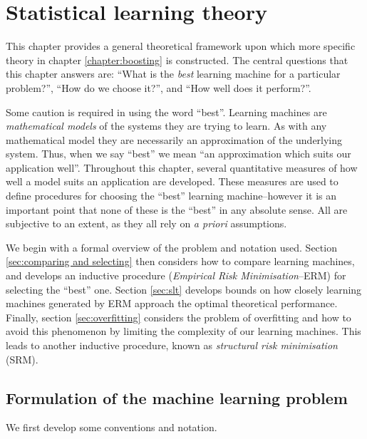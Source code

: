 
\chapter{Statistical learning theory}
\label{chapter:slt}

This chapter provides a general theoretical framework upon which more
specific theory in chapter \ref{chapter:boosting} is constructed.  The
central questions that this chapter answers are: ``What is the
\emph{best} learning machine for a particular problem?'', ``How do we
choose it?'', and ``How well does it perform?''.

Some caution is required in using the word ``best''.  Learning
machines are \emph{mathematical models} of the systems they are trying
to learn.  As with any mathematical model they are necessarily an
approximation of the underlying system.  Thus, when we say
``best'' we mean ``an approximation which suits our application
well''.  Throughout this chapter, several quantitative
measures of how well a model suits an application are developed.
These measures are used to define procedures for choosing the ``best''
learning machine--however it is an important point that none of
these is the ``best'' in any absolute sense.  All are subjective to an
extent, as they all rely on \emph{a priori} assumptions.

We begin with a formal overview of the problem and notation used.
Section \ref{sec:comparing and selecting} then considers how to
compare learning machines, and develops an inductive procedure
(\emph{Empirical Risk Minimisation}--ERM) for selecting the ``best'' one.
Section \ref{sec:slt} develops bounds on how closely learning machines
generated by ERM approach the optimal theoretical performance.
Finally, section \ref{sec:overfitting} considers the problem of
overfitting and how to avoid this phenomenon by limiting the
complexity of our learning machines.  This leads to another inductive
procedure, known as \emph{structural risk minimisation} (SRM).


\section{Formulation of the machine learning problem}
\label{sec:formulation}

We first develop some conventions and notation.

